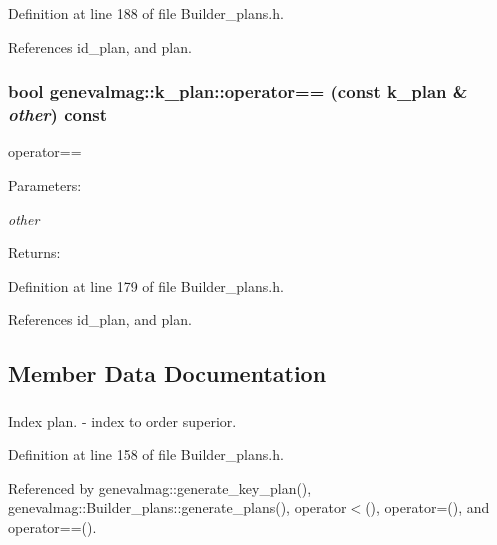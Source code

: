 Definition at line 188 of file Builder\_\-plans.h.

References id\_\-plan, and plan.\hypertarget{structgenevalmag_1_1k__plan_1ebe5a12c410624fec9631ff2e522767}{
\subsubsection[{operator==}]{\setlength{\rightskip}{0pt plus 5cm}bool genevalmag::k\_\-plan::operator== (const {\bf k\_\-plan} \& {\em other}) const}}
\label{structgenevalmag_1_1k__plan_1ebe5a12c410624fec9631ff2e522767}


operator== \begin{Desc}
\item[Parameters:]
\begin{description}
\item[{\em other}]\end{description}
\end{Desc}
\begin{Desc}
\item[Returns:]\end{Desc}


Definition at line 179 of file Builder\_\-plans.h.

References id\_\-plan, and plan.

\subsection{Member Data Documentation}
\hypertarget{structgenevalmag_1_1k__plan_477573001560bced8ad15aa7a5013ac0}{
\subsubsection[{id\_\-plan}]{}}
\label{structgenevalmag_1_1k__plan_477573001560bced8ad15aa7a5013ac0}


Index plan. - index to order superior. 



Definition at line 158 of file Builder\_\-plans.h.

Referenced by genevalmag::generate\_\-key\_\-plan(), genevalmag::Builder\_\-plans::generate\_\-plans(), operator$<$(), operator=(), and operator==().\hypertarget{structgenevalmag_1_1k__plan_c948a26cdaa4b9ea54cc04ac27c99e3c}{
\subsubsection[{plan}]{}}
\label{structgenevalmag_1_1k__plan_c948a26cdaa4b9ea54cc04ac27c99e3c}


